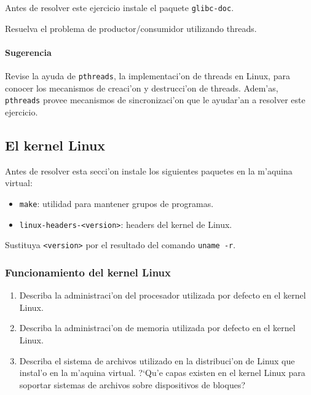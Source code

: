 Antes de resolver este ejercicio instale el paquete \texttt{glibc-doc}.

Resuelva el problema de productor/consumidor utilizando threads.

\paragraph{Sugerencia}

Revise la ayuda de \texttt{pthreads}, la implementaci'on de threads en Linux, para conocer los mecanismos de creaci'on y
destrucci'on de threads. Adem'as, \texttt{pthreads} provee mecanismos de sincronizaci'on que le ayudar'an a resolver este
ejercicio.



\subsection{El kernel Linux}

Antes de resolver esta secci'on instale los siguientes paquetes en la m'aquina virtual:

\begin{itemize}
\item \texttt{make}: utilidad para mantener grupos de programas.
\item \texttt{linux-headers-<version>}: headers del kernel de Linux.
\end{itemize}

Sustituya \texttt{<version>} por el resultado del comando \texttt{uname -r}.

\subsubsection{Funcionamiento del kernel Linux}

\begin{enumerate}

\item Describa la administraci'on del procesador utilizada por defecto en el kernel Linux.


\item Describa la administraci'on de memoria utilizada por defecto en el kernel Linux.


\item Describa el sistema de archivos utilizado en la distribuci'on de Linux que instal'o en la m'aquina virtual.
?`Qu'e capas existen en el kernel Linux para soportar sistemas de archivos sobre dispositivos de bloques?


\end{enumerate}

